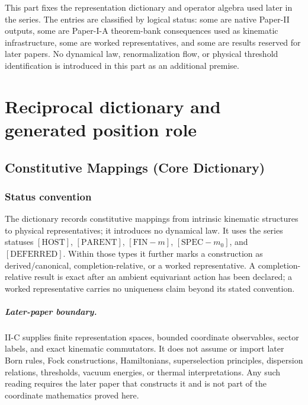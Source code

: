 \documentclass[12pt,a4paper]{article}
\begin{document}
\label{p2:part:dictionary-operator-algebra}

This part fixes the representation dictionary and operator algebra used later
in the series.  The entries are classified by logical status: some are native Paper-II
outputs, some are Paper-I-A theorem-bank consequences used as kinematic infrastructure, some are
worked representatives, and some are results reserved for later papers.  No
dynamical law, renormalization flow, or physical threshold identification is
introduced in this part as an additional premise.


\section{Reciprocal dictionary and generated position role}
\label{paper2c:sec:organized-dictionary}

\subsection{Constitutive Mappings (Core Dictionary)}


\subsubsection*{Status convention}

The dictionary records constitutive mappings from intrinsic kinematic
structures to physical representatives; it introduces no dynamical law.  It
uses the series statuses \([\mathrm{HOST}]\), \([\mathrm{PARENT}]\),
\([\mathrm{FIN}{-}m]\), \([\mathrm{SPEC}{-}m_0]\), and
\([\mathrm{DEFERRED}]\).  Within those types it further marks a construction
as derived/canonical, completion-relative, or a worked representative.  A
completion-relative result is exact after an ambient equivariant action has
been declared; a worked representative carries no uniqueness claim beyond
its stated convention.

\subparagraph{Later-paper boundary.}
\label{p2:sec:p4-closure-map}
II-C supplies finite representation spaces, bounded coordinate observables,
sector labels, and exact kinematic commutators.  It does not assume or import
later Born rules, Fock constructions, Hamiltonians, superselection principles,
dispersion relations, thresholds, vacuum energies, or thermal interpretations.
Any such reading requires the later paper that constructs it and is not part
of the coordinate mathematics proved here.
\end{document}
